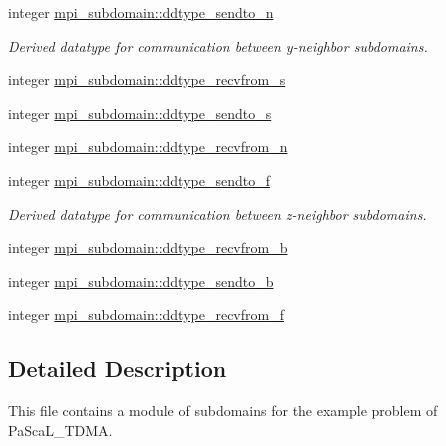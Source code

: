 \textbf{ }\par
\begin{DoxyCompactItemize}
\item 
integer \hyperlink{namespacempi__subdomain_a55f5c1af9bd941fd176e619bddbb8d82}{mpi\+\_\+subdomain\+::ddtype\+\_\+sendto\+\_\+n}
\begin{DoxyCompactList}\small\item\em Derived datatype for communication between y-\/neighbor subdomains. \end{DoxyCompactList}\item 
integer \hyperlink{namespacempi__subdomain_a1f46916f08758533cad3ecac33233e38}{mpi\+\_\+subdomain\+::ddtype\+\_\+recvfrom\+\_\+s}
\item 
integer \hyperlink{namespacempi__subdomain_a660f83d621188fb7eb60ad10eab4c9b5}{mpi\+\_\+subdomain\+::ddtype\+\_\+sendto\+\_\+s}
\item 
integer \hyperlink{namespacempi__subdomain_a74f1edb3c9227692b250285680518dc4}{mpi\+\_\+subdomain\+::ddtype\+\_\+recvfrom\+\_\+n}
\end{DoxyCompactItemize}

\textbf{ }\par
\begin{DoxyCompactItemize}
\item 
integer \hyperlink{namespacempi__subdomain_a4f3d66535b947c7afee75e6e73a47206}{mpi\+\_\+subdomain\+::ddtype\+\_\+sendto\+\_\+f}
\begin{DoxyCompactList}\small\item\em Derived datatype for communication between z-\/neighbor subdomains. \end{DoxyCompactList}\item 
integer \hyperlink{namespacempi__subdomain_ad6462f18c8c68c076005957e9d062252}{mpi\+\_\+subdomain\+::ddtype\+\_\+recvfrom\+\_\+b}
\item 
integer \hyperlink{namespacempi__subdomain_a7a2af0322a7aaa435951a5432859687a}{mpi\+\_\+subdomain\+::ddtype\+\_\+sendto\+\_\+b}
\item 
integer \hyperlink{namespacempi__subdomain_a4da19838e8bc3934ad5c24db424bec2c}{mpi\+\_\+subdomain\+::ddtype\+\_\+recvfrom\+\_\+f}
\end{DoxyCompactItemize}



\subsection{Detailed Description}
This file contains a module of subdomains for the example problem of Pa\+Sca\+L\+\_\+\+T\+D\+MA. 

